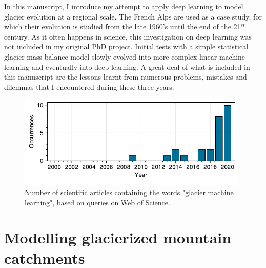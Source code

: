 In this manuscript, I introduce my attempt to apply deep learning to model glacier evolution at a regional scale. The French Alps are used as a case study, for which their evolution is studied from the late 1960's until the end of the 21$^{st}$ century. As it often happens in science, this investigation on deep learning was not included in my original PhD project. Initial tests with a simple statistical glacier mass balance model slowly evolved into more complex linear machine learning and eventually into deep learning. A great deal of what is included in this manuscript are the lessons learnt from numerous problems, mistakes and dilemmas that I encountered during these three years. 

\begin{figure}[h]
\centering
\includegraphics[width=11cm]{Figures/intro/Figure_4.pdf}
\caption{Number of scientific articles containing the words "glacier machine learning", based on queries on Web of Science.}
\label{intro:fig4}
\end{figure} 

\section{Modelling glacierized mountain catchments}

